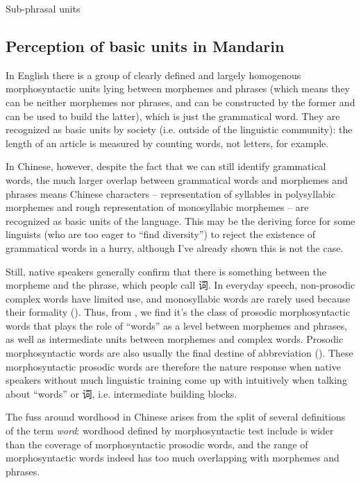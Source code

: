 \documentclass[UTF8, a4paper, oneside, scheme=plain]{ctexrep}
\newcommand*{\term}[1]{\emph{#1}}
\begin{document}
\begin{sidewaystable}
    \centering
    \caption{Sub-phrasal units}
    \label{tbl:sub-phrasal-units}
    
\end{sidewaystable}

\subsection{Perception of basic units in Mandarin}\label{sec:pos.word.perception}

In English there is a group of clearly defined and largely homogenous morphosyntactic units 
lying between morphemes and phrases
(which means they can be neither morphemes nor phrases,
and can be constructed by the former and can be used to build the latter),
which is just the grammatical word.
They are recognized as basic units by society 
(i.e. outside of the linguistic community):
the length of an article is measured by counting words, not letters, for example.

In Chinese, however, despite the fact that 
we can still identify grammatical words,
the much larger overlap between grammatical words and morphemes and phrases
means Chinese characters -- representation of syllables in polysyllabic morphemes 
and rough representation of monosyllabic morphemes -- 
are recognized as basic units of the language.
This may be the deriving force for some linguists 
(who are too eager to ``find diversity'')
to reject the existence of grammatical words in a hurry,
although I've already shown this is not the case.

Still, native speakers generally 
confirm that there is something between the morpheme and the phrase, 
which people call 词.
In everyday speech, 
non-prosodic complex words have limited use, 
and monosyllabic words are rarely used 
because their formality ().  
Thus, from , 
we find it's the class of prosodic morphosyntactic words 
that plays the role of ``words''
as a level between morphemes and phrases,
as well as intermediate units between morphemes and complex words.
Prosodic morphosyntactic words 
are also usually the final destine 
of abbreviation ().
These morphosyntactic prosodic words are therefore the nature response 
when native speakers without much linguistic training 
come up with intuitively when talking about ``words'' or 词,
i.e. intermediate building blocks.

The fuss around wordhood in Chinese 
arises from the split of several definitions of the term \term{word}:
wordhood defined by morphosyntactic test include is wider 
than the coverage of morphosyntactic prosodic words,
and the range of morphosyntactic words indeed 
has too much overlapping with morphemes and phrases.
\end{document}
